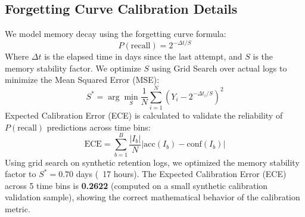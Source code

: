 \documentclass{article}
\begin{document}
\subsection{Forgetting Curve Calibration Details}\label{app:forgetting_calib}
We model memory decay using the forgetting curve formula:
\[P(\text{recall}) = 2^{-\Delta t / S}\]
Where $\Delta t$ is the elapsed time in days since the last attempt, and $S$ is the memory stability factor. We optimize $S$ using Grid Search over actual logs to minimize the Mean Squared Error (MSE):
\[S^* = \arg\min_{S} \frac{1}{N} \sum_{i=1}^N \left( Y_i - 2^{-\Delta t_i / S} \right)^2\]
Expected Calibration Error (ECE) is calculated to validate the reliability of $P(\text{recall})$ predictions across time bins:
\[\text{ECE} = \sum_{b=1}^B \frac{|I_b|}{N} \left| \text{acc}(I_b) - \text{conf}(I_b) \right|\]
Using grid search on synthetic retention logs, we optimized the memory stability factor to $S^* = 0.70$ days (~17 hours). The Expected Calibration Error (ECE) across 5 time bins is \textbf{0.2622} (computed on a small synthetic calibration validation sample), showing the correct mathematical behavior of the calibration metric.
\end{document}
